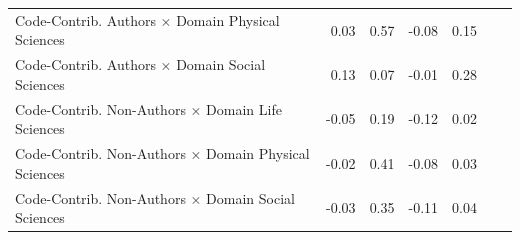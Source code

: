 \documentclass[
  letterpaper,
  DIV=11,
  numbers=noendperiod]{scrartcl}
\begin{document}
\begin{table}
{\begin{tabular}{l*{6}{r}}
    \cellcolor{gray!10}Code-Contrib. Authors × Domain Physical Sciences & \cellcolor{gray!10}0.03 & \cellcolor{gray!10}0.57 & \cellcolor{gray!10}-0.08 & \cellcolor{gray!10}0.15 \\
    \cellcolor{white}Code-Contrib. Authors × Domain Social Sciences & \cellcolor{white}0.13 & \cellcolor{white}0.07 & \cellcolor{white}-0.01 & \cellcolor{white}0.28 \\
    \cellcolor{gray!10}Code-Contrib. Non-Authors × Domain Life Sciences & \cellcolor{gray!10}-0.05 & \cellcolor{gray!10}0.19 & \cellcolor{gray!10}-0.12 & \cellcolor{gray!10}0.02 \\
    \cellcolor{white}Code-Contrib. Non-Authors × Domain Physical Sciences & \cellcolor{white}-0.02 & \cellcolor{white}0.41 & \cellcolor{white}-0.08 & \cellcolor{white}0.03 \\
    \cellcolor{gray!10}Code-Contrib. Non-Authors × Domain Social Sciences & \cellcolor{gray!10}-0.03 & \cellcolor{gray!10}0.35 & \cellcolor{gray!10}-0.11 & \cellcolor{gray!10}0.04 \\
\bottomrule
\end{tabular}

}

\end{table}%
\end{document}
